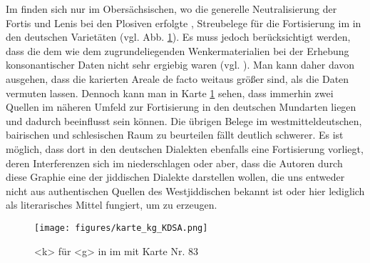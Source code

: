 

Im  finden sich nur im Obersächsischen, wo die generelle Neutralisierung der Fortis und Lenis bei den Plosiven erfolgte \parencite[332]{Schirmunski1962}, Streubelege für die Fortisierung im  in den deutschen Varietäten (vgl. Abb. \ref{kartekgkdsa}). Es muss jedoch berücksichtigt werden, dass die dem  wie dem  zugrundeliegenden Wenkermaterialien bei der Erhebung konsonantischer Daten nicht sehr ergiebig waren (vgl. \cite{Bremer1895}). Man kann daher davon ausgehen, dass die karierten Areale de facto weitaus größer sind, als die Daten vermuten lassen. Dennoch kann man in Karte \ref{kartekgkdsa} sehen, dass immerhin zwei Quellen im näheren Umfeld zur Fortisierung in den deutschen Mundarten liegen und dadurch beeinflusst sein können. Die übrigen Belege im westmitteldeutschen, bairischen und schlesischen Raum zu beurteilen fällt deutlich schwerer. Es ist möglich, dass dort in den deutschen Dialekten ebenfalls eine Fortisierung vorliegt, deren Interferenzen sich im  niederschlagen oder aber, dass die Autoren durch diese Graphie eine  der jiddischen Dialekte darstellen wollen, die uns entweder nicht aus authentischen Quellen des Westjiddischen bekannt ist oder hier lediglich als literarisches Mittel fungiert, um  zu erzeugen.\\

  \begin{figure}[h!]
		\centering
\texttt{[image: figures/karte\_kg\_KDSA.png]}
		\caption{\label{kartekgkdsa} <k> für <g> in  im  mit  Karte Nr. 83}
		\end{figure}
\FloatBarrier
		
